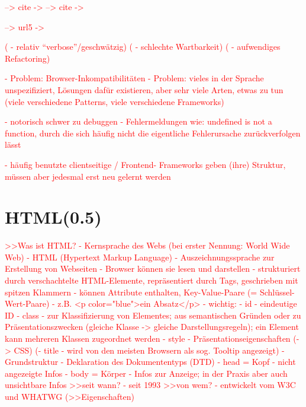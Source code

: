 \documentclass[a4paper, 12pt, hidelinks, listof=totoc, listoftables=totoc, bibliography=totoc]{scrreprt}
\newcommand{\TODO}[1]{\textcolor{red}{#1}\newline}
\begin{document}
\TODO{-->  cite -> %
}
\TODO{-->  cite -> %
}

\TODO{-->  url5 -> %
}


\TODO{(  - relativ "`verbose"'/geschwätzig)}
\TODO{(  - schlechte Wartbarkeit)}
\TODO{(  - aufwendiges Refactoring)}


\TODO{- Problem: Browser-Inkompatibilitäten}
\TODO{- Problem: vieles in der Sprache unspezifiziert, Lösungen dafür existieren, aber sehr viele Arten, etwas zu tun (viele verschiedene Patterns, viele verschiedene Frameworks)}

\TODO{- notorisch schwer zu debuggen - Fehlermeldungen wie: undefined is not a function, durch die sich häufig nicht die eigentliche Fehlerursache zurückverfolgen lässt}


\TODO{- häufig benutzte clientseitige / Frontend- Frameworks geben (ihre) Struktur, müssen aber jedesmal erst neu gelernt werden}


\section{HTML(0.5)}


\TODO{>>Was ist HTML?
	- Kernsprache des Webs (bei erster Nennung: World Wide Web)
	- HTML (Hypertext Markup Language)
	- Auszeichnungssprache zur Erstellung von Webseiten
	- Browser können sie lesen und darstellen
	- strukturiert durch verschachtelte HTML-Elemente, repräsentiert durch Tags, geschrieben mit spitzen Klammern
		- können Attribute enthalten, Key-Value-Paare (= Schlüssel-Wert-Paare)
		- z.B. <p color="blue">ein Absatz</p>
		- wichtig:
			- id - eindeutige ID
			- class - zur Klassifizierung von Elementes; aus semantischen Gründen oder zu Präsentationszwecken (gleiche Klasse -> gleiche Darstellungsregeln); ein Element kann mehreren Klassen zugeordnet werden
			- style - Präsentationseigenschaften (-> CSS)
			(- title - wird von den meisten Browsern als sog. Tooltip angezeigt)
	- Grundstruktur
		- Deklaration des Dokumententyps (DTD)
		- head = Kopf - nicht angezeigte Infos
		- body = Körper - Infos zur Anzeige; in der Praxis aber auch unsichtbare Infos
}
\TODO{>>seit wann?
	- seit 1993}
\TODO{>>von wem?
	- entwickelt vom W3C und WHATWG}
\TODO{(>>Eigenschaften)}
\end{document}
